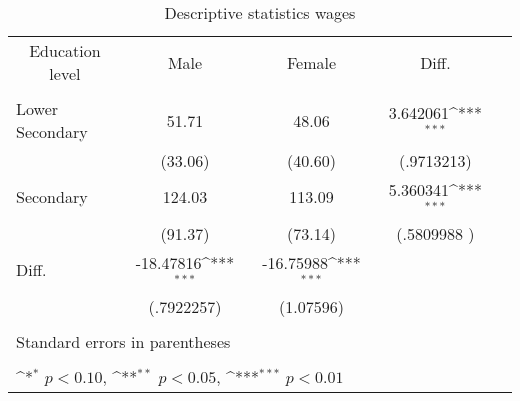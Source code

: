 \begin{table}[htbp]\centering
    \def\sym#1{\ifmmode^{#1}\else\(^{#1}\)\fi}
    \caption{\label{Tab:desc-1a}Descriptive statistics wages}
    \begin{tabular}{l*{4}{c}}
        \hline

        \multicolumn{1}{c}{Education level}   &\multicolumn{1}{c}{Male}&\multicolumn{1}{c}{Female}&\multicolumn{1}{c}{Diff.}\\
                        \\
        \hline
        Lower Secondary &       51.71           &    48.06          &   3.642061\sym{***} \\
                        &       (33.06)         &   (40.60)         &  (.9713213)       \\
        Secondary       &       124.03          &    113.09         &   5.360341\sym{***}   \\
                        &       (91.37)         &   (73.14)         &   (.5809988 )       \\
        Diff.           &       -18.47816\sym{***} &   -16.75988\sym{***} &                      \\
                        &       (.7922257)  &   (1.07596)           &                       \\
        \\
        \hline
        \multicolumn{3}{l}{\footnotesize Standard errors in parentheses}\\
        \multicolumn{3}{l}{\footnotesize }\\
        \multicolumn{3}{l}{\footnotesize \sym{*} \(p<0.10\), \sym{**} \(p<0.05\), \sym{***} \(p<0.01\)}\\

    \end{tabular}
\end{table}
